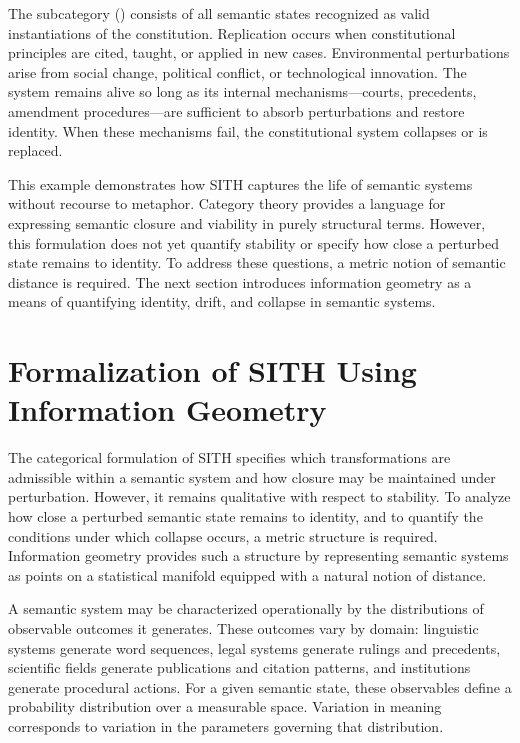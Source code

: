 \documentclass[11pt,oneside]{article}
\begin{document}
The subcategory () consists of all semantic states recognized as valid instantiations of the constitution. Replication occurs when constitutional principles are cited, taught, or applied in new cases. Environmental perturbations arise from social change, political conflict, or technological innovation. The system remains alive so long as its internal mechanisms—courts, precedents, amendment procedures—are sufficient to absorb perturbations and restore identity. When these mechanisms fail, the constitutional system collapses or is replaced.

This example demonstrates how SITH captures the life of semantic systems without recourse to metaphor. Category theory provides a language for expressing semantic closure and viability in purely structural terms. However, this formulation does not yet quantify stability or specify how close a perturbed state remains to identity. To address these questions, a metric notion of semantic distance is required. The next section introduces information geometry as a means of quantifying identity, drift, and collapse in semantic systems.

\section{Formalization of SITH Using Information Geometry}

The categorical formulation of SITH specifies which transformations are admissible within a semantic system and how closure may be maintained under perturbation. However, it remains qualitative with respect to stability. To analyze how close a perturbed semantic state remains to identity, and to quantify the conditions under which collapse occurs, a metric structure is required. Information geometry provides such a structure by representing semantic systems as points on a statistical manifold equipped with a natural notion of distance.

A semantic system may be characterized operationally by the distributions of observable outcomes it generates. These outcomes vary by domain: linguistic systems generate word sequences, legal systems generate rulings and precedents, scientific fields generate publications and citation patterns, and institutions generate procedural actions. For a given semantic state, these observables define a probability distribution over a measurable space. Variation in meaning corresponds to variation in the parameters governing that distribution.
\end{document}
